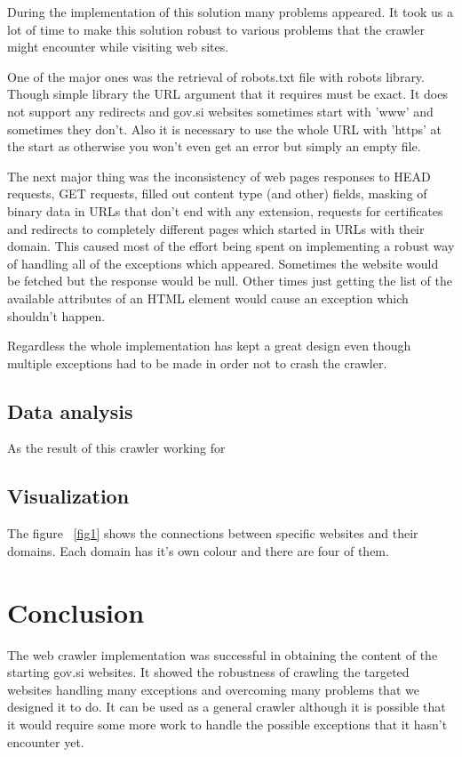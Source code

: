 \documentclass[9pt]{IEEEtran}
\begin{document}
During the implementation of this solution many problems appeared.
It took us a lot of time to make this solution robust to various problems that the crawler might encounter while visiting web sites.

One of the major ones was the retrieval of robots.txt file with robots library. 
Though simple library the URL argument that it requires must be exact.
It does not support any redirects and gov.si websites sometimes start with 'www' and sometimes they don't. 
Also it is necessary to use the whole URL with 'https' at the start as otherwise you won't even get an error but simply an empty file.

The next major thing was the inconsistency of web pages responses to HEAD requests, GET requests, filled out content type (and other) fields, masking of binary data in URLs that don't end with any extension, requests for certificates and redirects to completely different pages which started in URLs with their domain.
This caused most of the effort being spent on implementing a robust way of handling all of the exceptions which appeared. 
Sometimes the website would be fetched but the response would be null.
Other times just getting the list of the available attributes of an HTML element would cause an exception which shouldn't happen.

Regardless the whole implementation has kept a great design even though multiple exceptions had to be made in order not to crash the crawler.

\subsection{Data analysis}

As the result of this crawler working for %

\subsection{Visualization}

The figure ~\ref{fig1} shows the connections between specific websites and their domains.
Each domain has it's own colour and there are four of them.
 

\section{Conclusion}

The web crawler implementation was successful in obtaining the content of the starting gov.si websites.
It showed the robustness of crawling the targeted websites handling many exceptions and overcoming many problems that we designed it to do.
It can be used as a general crawler although it is possible that it would require some more work to handle the possible exceptions that it hasn't encounter yet.


%
\end{document}
